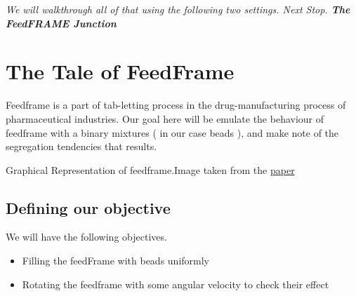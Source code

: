 \documentclass{tufte-book} %
\begin{document}
\textit{We will walkthrough all of that using the following two settings. Next Stop. \textbf{The FeedFRAME Junction} }

\section{The Tale of FeedFrame}

Feedframe is a part of tab-letting process in the drug-manufacturing process of pharmaceutical industries. Our goal here will be emulate the behaviour of feedframe with a binary mixtures ( in our case beads ), and make note of the segregation tendencies that results.

   \begin{marginfigure}
   \caption{Graphical Representation of feedframe.Image taken from the \href{http://www.americanpharmaceuticalreview.com/Featured-Articles/116357-Sample-Presentation-in-Rotary-Tablet-Press-Feed-Frame-Monitoring-by-Near-Infrared-Spectroscopy/}{paper} }
 \end{marginfigure}

\subsection{Defining our objective}

We will have the following objectives.
\begin{itemize}
\item Filling the feedFrame with beads uniformly
\item Rotating the feedframe with some angular velocity to check their effect
\end{itemize}
\end{document}
